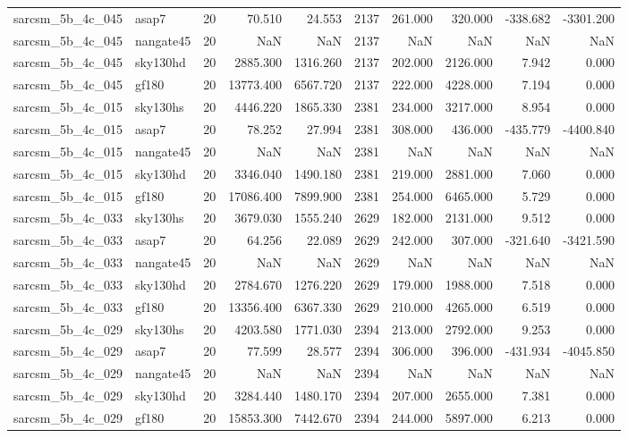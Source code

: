 \begin{longtable}{llrrrrrrrr}
sarcsm\_5b\_4c\_045 & asap7 & 20 & 70.510 & 24.553 & 2137 & 261.000 & 320.000 & -338.682 & -3301.200 \\
sarcsm\_5b\_4c\_045 & nangate45 & 20 & NaN & NaN & 2137 & NaN & NaN & NaN & NaN \\
sarcsm\_5b\_4c\_045 & sky130hd & 20 & 2885.300 & 1316.260 & 2137 & 202.000 & 2126.000 & 7.942 & 0.000 \\
sarcsm\_5b\_4c\_045 & gf180 & 20 & 13773.400 & 6567.720 & 2137 & 222.000 & 4228.000 & 7.194 & 0.000 \\
sarcsm\_5b\_4c\_015 & sky130hs & 20 & 4446.220 & 1865.330 & 2381 & 234.000 & 3217.000 & 8.954 & 0.000 \\
sarcsm\_5b\_4c\_015 & asap7 & 20 & 78.252 & 27.994 & 2381 & 308.000 & 436.000 & -435.779 & -4400.840 \\
sarcsm\_5b\_4c\_015 & nangate45 & 20 & NaN & NaN & 2381 & NaN & NaN & NaN & NaN \\
sarcsm\_5b\_4c\_015 & sky130hd & 20 & 3346.040 & 1490.180 & 2381 & 219.000 & 2881.000 & 7.060 & 0.000 \\
sarcsm\_5b\_4c\_015 & gf180 & 20 & 17086.400 & 7899.900 & 2381 & 254.000 & 6465.000 & 5.729 & 0.000 \\
sarcsm\_5b\_4c\_033 & sky130hs & 20 & 3679.030 & 1555.240 & 2629 & 182.000 & 2131.000 & 9.512 & 0.000 \\
sarcsm\_5b\_4c\_033 & asap7 & 20 & 64.256 & 22.089 & 2629 & 242.000 & 307.000 & -321.640 & -3421.590 \\
sarcsm\_5b\_4c\_033 & nangate45 & 20 & NaN & NaN & 2629 & NaN & NaN & NaN & NaN \\
sarcsm\_5b\_4c\_033 & sky130hd & 20 & 2784.670 & 1276.220 & 2629 & 179.000 & 1988.000 & 7.518 & 0.000 \\
sarcsm\_5b\_4c\_033 & gf180 & 20 & 13356.400 & 6367.330 & 2629 & 210.000 & 4265.000 & 6.519 & 0.000 \\
sarcsm\_5b\_4c\_029 & sky130hs & 20 & 4203.580 & 1771.030 & 2394 & 213.000 & 2792.000 & 9.253 & 0.000 \\
sarcsm\_5b\_4c\_029 & asap7 & 20 & 77.599 & 28.577 & 2394 & 306.000 & 396.000 & -431.934 & -4045.850 \\
sarcsm\_5b\_4c\_029 & nangate45 & 20 & NaN & NaN & 2394 & NaN & NaN & NaN & NaN \\
sarcsm\_5b\_4c\_029 & sky130hd & 20 & 3284.440 & 1480.170 & 2394 & 207.000 & 2655.000 & 7.381 & 0.000 \\
sarcsm\_5b\_4c\_029 & gf180 & 20 & 15853.300 & 7442.670 & 2394 & 244.000 & 5897.000 & 6.213 & 0.000 \\

\end{longtable}

